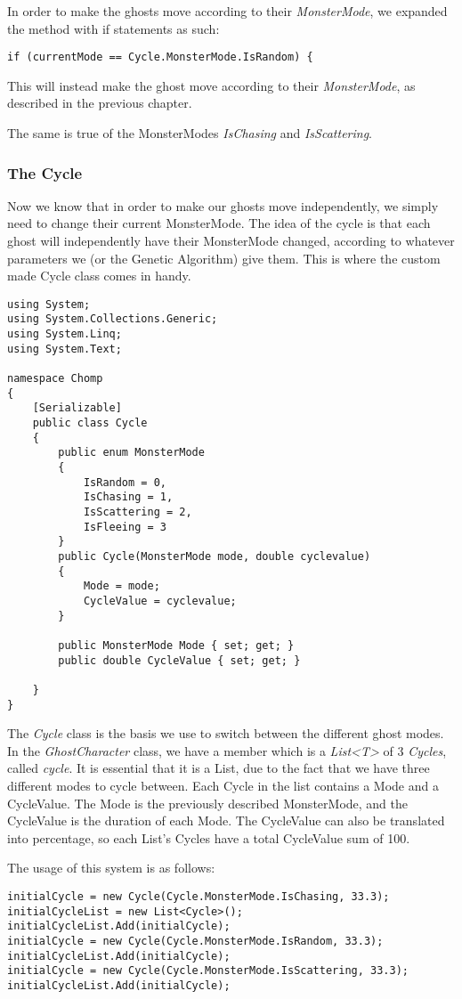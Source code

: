In order to make the ghosts move according to their \emph{MonsterMode}, we expanded the method with if statements as such:
\begin{lstlisting}
if (currentMode == Cycle.MonsterMode.IsRandom) {
\end{lstlisting}

This will instead make the ghost move according to their \emph{MonsterMode}, as described in the previous chapter.

The same is true of the MonsterModes \emph{IsChasing} and \emph{IsScattering}.

\subsubsection*{The Cycle}
Now we know that in order to make our ghosts move independently, we simply need to change their current MonsterMode. The idea of the cycle is that each ghost will independently have their MonsterMode changed, according to whatever parameters we (or the Genetic Algorithm) give them. This is where the custom made Cycle class comes in handy.

\begin{lstlisting}[caption=Cycle class and its constructor,label=lst:cycle]
using System;
using System.Collections.Generic;
using System.Linq;
using System.Text;

namespace Chomp
{
	[Serializable]
	public class Cycle
	{
		public enum MonsterMode
		{
			IsRandom = 0,
			IsChasing = 1,
			IsScattering = 2,
			IsFleeing = 3
		}
		public Cycle(MonsterMode mode, double cyclevalue)
		{
			Mode = mode;
			CycleValue = cyclevalue;
		}

		public MonsterMode Mode { set; get; }
		public double CycleValue { set; get; }

	}
}
\end{lstlisting}

The \emph{Cycle} class is the basis we use to switch between the different ghost modes. In the \emph{GhostCharacter} class, we have a member which is a  \emph{List<T>} of 3 \emph{Cycles}, called \emph{cycle}.
It is essential that it is a List, due to the fact that we have three different modes to cycle between. Each Cycle in the list contains a Mode and a CycleValue. The Mode is the previously described MonsterMode, and the CycleValue is the duration of each Mode. The CycleValue can also be translated into percentage, so each List’s Cycles have a total CycleValue sum of 100.

The usage of this system is as follows:
\begin{lstlisting}[caption=Snippet of GameBoard.cs and Cycle instantiation,label=lst:cycleInst]
initialCycle = new Cycle(Cycle.MonsterMode.IsChasing, 33.3);
initialCycleList = new List<Cycle>();
initialCycleList.Add(initialCycle);
initialCycle = new Cycle(Cycle.MonsterMode.IsRandom, 33.3);
initialCycleList.Add(initialCycle);
initialCycle = new Cycle(Cycle.MonsterMode.IsScattering, 33.3);
initialCycleList.Add(initialCycle);
\end{lstlisting}

